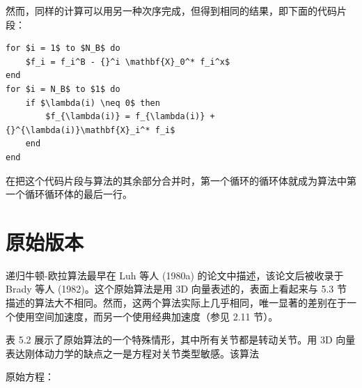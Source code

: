 \documentclass[10pt,a4paper]{book}
\theoremstyle{thmstyle} %
\theoremstyle{defstyle} %
\theoremstyle{prostyle} %
\begin{document}
然而，同样的计算可以用另一种次序完成，但得到相同的结果，即下面的代码片段：



\begin{verbatim}
for $i = 1$ to $N_B$ do
    $f_i = f_i^B - {}^i \mathbf{X}_0^* f_i^x$
end
for $i = N_B$ to $1$ do
    if $\lambda(i) \neq 0$ then
        $f_{\lambda(i)} = f_{\lambda(i)} + {}^{\lambda(i)}\mathbf{X}_i^* f_i$
    end
end
\end{verbatim}


在把这个代码片段与算法的其余部分合并时，第一个循环的循环体就成为算法中第一个循环循环体的最后一行。



\section{原始版本}





递归牛顿-欧拉算法最早在 Luh 等人 (1980a) 的论文中描述，该论文后被收录于 Brady 等人 (1982)。这个原始算法是用 3D 向量表述的，表面上看起来与 5.3 节描述的算法大不相同。然而，这两个算法实际上几乎相同，唯一显著的差别在于一个使用空间加速度，而另一个使用经典加速度（参见 2.11 节）。



表 5.2 展示了原始算法的一个特殊情形，其中所有关节都是转动关节。用 3D 向量表达刚体动力学的缺点之一是方程对关节类型敏感。该算法



原始方程：
\end{document}
